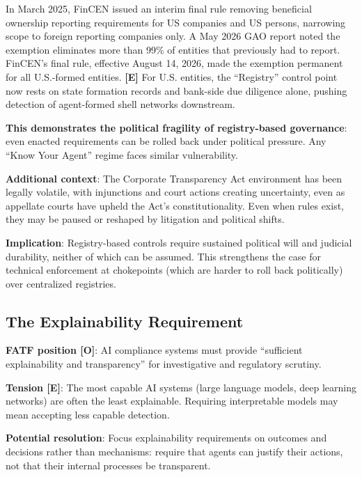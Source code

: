 \documentclass[11pt,letterpaper]{article}
\begin{document}
\begin{warnbox}
In March 2025, FinCEN issued an interim final rule removing beneficial ownership reporting requirements for US companies and US persons, narrowing scope to foreign reporting companies only. A May 2026 GAO report noted the exemption eliminates more than 99\% of entities that previously had to report. FinCEN's final rule, effective August 14, 2026, made the exemption permanent for all U.S.-formed entities. \textbf{[E]} For U.S. entities, the ``Registry'' control point now rests on state formation records and bank-side due diligence alone, pushing detection of agent-formed shell networks downstream.

\textbf{This demonstrates the political fragility of registry-based governance}: even enacted requirements can be rolled back under political pressure. Any ``Know Your Agent'' regime faces similar vulnerability.

\textbf{Additional context}: The Corporate Transparency Act environment has been legally volatile, with injunctions and court actions creating uncertainty, even as appellate courts have upheld the Act's constitutionality. Even when rules exist, they may be paused or reshaped by litigation and political shifts.

\textbf{Implication}: Registry-based controls require sustained political will and judicial durability, neither of which can be assumed. This strengthens the case for technical enforcement at chokepoints (which are harder to roll back politically) over centralized registries.
\end{warnbox}

\subsection{The Explainability Requirement}

\textbf{FATF position [O]}: AI compliance systems must provide ``sufficient explainability and transparency'' for investigative and regulatory scrutiny.

\textbf{Tension [E]}: The most capable AI systems (large language models, deep learning networks) are often the least explainable. Requiring interpretable models may mean accepting less capable detection.

\textbf{Potential resolution}: Focus explainability requirements on outcomes and decisions rather than mechanisms: require that agents can justify their actions, not that their internal processes be transparent.
\end{document}
